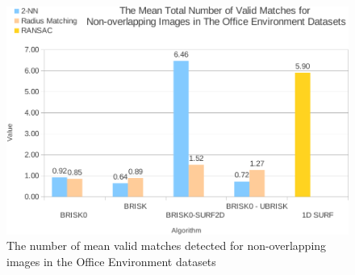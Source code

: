 \documentclass{report}
\begin{document}
% 
%


\begin{figure}
  \centering
    \includegraphics[width=1.0\textwidth]{../Drawings/Graphs/oe_nvm_nol.pdf}
    \caption{The number of mean valid matches detected for non-overlapping images in the Office Environment datasets} 
    \label{fig:oe_nvm_nol}
\end{figure}
\end{document}
